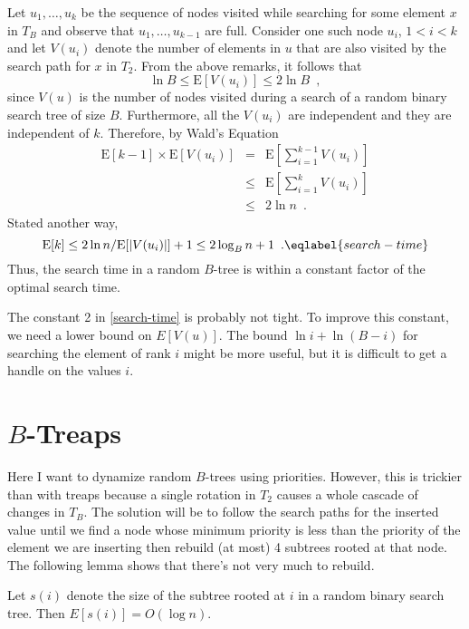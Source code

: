 \documentclass[lotsofwhite,charterfonts]{patmorin}
\newcommand{\E}{\mathrm{E}}
\begin{document}
Let $u_1,\ldots,u_k$ be the sequence of nodes visited while searching
for some element $x$ in $T_B$ and observe that $u_1,\ldots,u_{k-1}$
are full.  Consider one such node $u_i$, $1<i<k$ and let $V(u_i)$
denote the number of elements in $u$ that are also visited by the
search path for $x$ in $T_2$.  From the above remarks, it follows that
\[ 
     \ln B \le \E[V(u_i)] \le 2\ln B \enspace ,  
\] 
since $V(u)$ is the number of nodes visited during a search of a
random binary search tree of size $B$.  Furthermore, all the $V(u_i)$
are independent and they are independent of $k$.  Therefore, by Wald's
Equation
\begin{eqnarray*}
    \E\left[k-1\right]\times \E\left[V(u_i)\right] 
	&  =  & \E\left[\sum_{i=1}^{k-1} V(u_i)\right] \\
        & \le & \E\left[\sum_{i=1}^{k} V(u_i)\right] \\
        & \le & 2\ln n 
	\enspace . 
\end{eqnarray*}
Stated another way,
\begin{equation}
	\E[k] \le 2\ln n/\E[|V(u_i)|]+1 \le  2\log_B n + 1  \enspace .
	\eqlabel{search-time}
\end{equation}
Thus, the search time in a random $B$-tree is within a constant factor
of the optimal search time.

\begin{rem}
The constant 2 in \eqref{search-time} is probably not tight. To
improve this constant, we need a lower bound on $E[V(u)]$.  The bound
$\ln i+\ln (B-i)$ for searching the element of rank $i$ might be more
useful, but it is difficult to get a handle on the values $i$.
\end{rem}

\section{$B$-Treaps}

Here I want to dynamize random $B$-trees using priorities.  However,
this is trickier than with treaps because a single rotation in $T_2$
causes a whole cascade of changes in $T_B$.  The solution will be to
follow the search paths for the inserted value until we find a node
whose minimum priority is less than the priority of the element we are
inserting then rebuild (at most) 4 subtrees rooted at that node.  The
following lemma shows that there's not very much to rebuild.

\begin{lem}
Let $s(i)$ denote the size of the subtree rooted at $i$ in a random
binary search tree.  Then  $E[s(i)] = O(\log n)$.
\end{lem}
\end{document}
